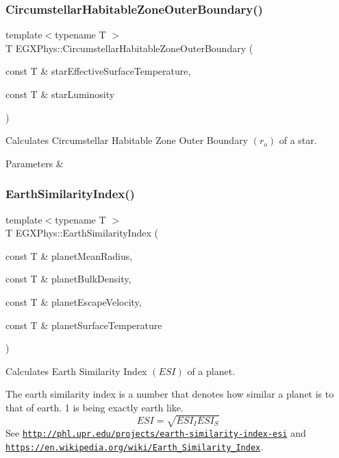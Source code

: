 \subsubsection{\texorpdfstring{Circumstellar\+Habitable\+Zone\+Outer\+Boundary()}{CircumstellarHabitableZoneOuterBoundary()}}
{\footnotesize\ttfamily template$<$typename T $>$ \\
T E\+G\+X\+Phys\+::\+Circumstellar\+Habitable\+Zone\+Outer\+Boundary (\begin{DoxyParamCaption}\item[{const T \&}]{star\+Effective\+Surface\+Temperature,  }\item[{const T \&}]{star\+Luminosity }\end{DoxyParamCaption})}



Calculates Circumstellar Habitable Zone Outer Boundary $(r_o)$ of a star. 


\begin{DoxyParams}{Parameters}
{\em } & \\
\hline
\end{DoxyParams}
\mbox{\label{group___astrophysics_ga4b86397b1c839c49ac599d49fda207d4}} 
\subsubsection{\texorpdfstring{Earth\+Similarity\+Index()}{EarthSimilarityIndex()}}
{\footnotesize\ttfamily template$<$typename T $>$ \\
T E\+G\+X\+Phys\+::\+Earth\+Similarity\+Index (\begin{DoxyParamCaption}\item[{const T \&}]{planet\+Mean\+Radius,  }\item[{const T \&}]{planet\+Bulk\+Density,  }\item[{const T \&}]{planet\+Escape\+Velocity,  }\item[{const T \&}]{planet\+Surface\+Temperature }\end{DoxyParamCaption})}



Calculates Earth Similarity Index $(ESI)$ of a planet. 

The earth similarity index is a number that denotes how similar a planet is to that of earth. 1 is being exactly earth like. \[ESI=\sqrt{ESI_I ESI_S}\] See \href{http://phl.upr.edu/projects/earth-similarity-index-esi}{\tt http\+://phl.\+upr.\+edu/projects/earth-\/similarity-\/index-\/esi} and \href{https://en.wikipedia.org/wiki/Earth_Similarity_Index}{\tt https\+://en.\+wikipedia.\+org/wiki/\+Earth\+\_\+\+Similarity\+\_\+\+Index}.

